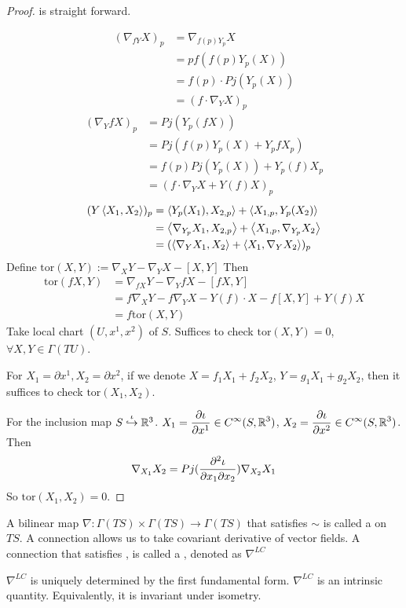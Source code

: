 \begin{proof}
     is straight forward.

    \begin{align*}
        (\nabla_{fY}X)_p&=\nabla_{f(p)Y_p}X\\
        &=pf(f(p)Y_p(X))\\
        &=f(p)\cdot Pj(Y_p(X))\\
        &=(f\cdot \nabla_YX)_p
    \end{align*}
       \begin{align*}
        (\nabla_YfX )_p&=Pj(Y_p(fX))\\
        &=Pj(f(p)Y_p(X)+Y_pfX_p)\\
        &=f(p)Pj(Y_p(X))+Y_p(f)X_p\\
        &=(f\cdot \nabla_YX+Y(f)X)_p
    \end{align*}
    \begin{align*}
        (Y\left<X_1,X_2\right>)_p&=\left<Y_p(X_1),X_{2,p}\right>+\left<X_{1,p},Y_p(X_2)\right>\\
        &=\left<\nabla_{Y_p}X_1,X_{2,p}\right>+\left<X_{1,p},\nabla_{Y_p}X_2\right>\\
        &=(\left<\nabla_YX_1,X_2\right>+\left<X_1,\nabla_YX_2\right>)_p
    \end{align*}
     Define $ \mathrm{tor}(X,Y):=\nabla_XY-\nabla_YX-[X,Y] $ 
    Then 
    \begin{align*}
        \mathrm{tor}(fX,Y)&=\nabla_{fX}Y-\nabla_YfX-[fX,Y]\\
        &=f\nabla_XY-f\nabla_YX-Y(f)\cdot X-f[X,Y]+Y(f)X\\
        &=f\mathrm{tor}(X,Y)
    \end{align*}
    Take local chart  $ (U,x^1,x^2) $ of  $ S $. Suffices to check  $ \mathrm{tor}(X,Y)=0 $, $ \forall X,Y\in \Gamma(TU) $.   
    
    For  $ X_1=\partial x^1,X_2=\partial x^2 $, if  we denote  $ X=f_1X_1+f_2X_2 $,  $ Y=g_1X_1+g_2X_2 $,
    then it   suffices to check  $ \mathrm{tor}(X_1,X_2) $.

    For the inclusion map  $ S\overset{\iota}{\hookrightarrow}\mathbb R^3 $.  $ X_1=\displaystyle\frac{\partial \iota}{\partial x^1}\in C^\infty(S,\mathbb R^3) $,  $ X_2=\displaystyle\frac{\partial \iota}{\partial x^2}\in C^\infty(S,\mathbb R^3) $. Then 
    \[\nabla_{X_1}X_2=Pj(\displaystyle\frac{\partial^2\iota}{\partial x_1\partial x_2})\nabla_{X_2}X_1\]
    So  $ \mathrm{tor}(X_1,X_2)=0 $.    
\end{proof}

\begin{definition}
    A bilinear map  $ \nabla:\Gamma(TS)\times \Gamma(TS)\rightarrow \Gamma(TS) $ that satisfies  $ \sim $  is called  a  on  $ TS $. A connection allows us to take covariant derivative of vector fields. A connection that satisfies , is called a , denoted as  $ \nabla^{LC} $  
\end{definition}
\begin{theorem}
    $ \nabla^{LC} $ is uniquely determined by the first fundamental form. \ie  $ \nabla^{LC}$ is an intrinsic quantity. Equivalently, it is invariant under isometry.
\end{theorem}


